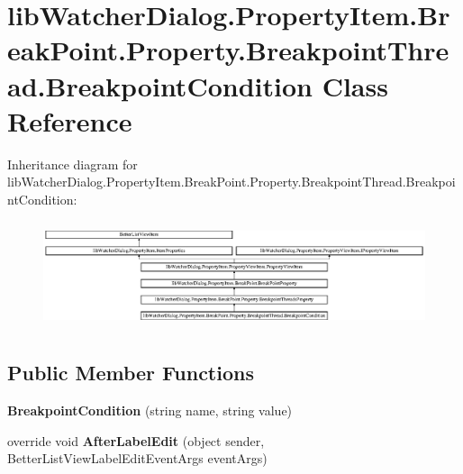 \hypertarget{classlib_watcher_dialog_1_1_property_item_1_1_break_point_1_1_property_1_1_breakpoint_thread_1_1_breakpoint_condition}{\section{lib\+Watcher\+Dialog.\+Property\+Item.\+Break\+Point.\+Property.\+Breakpoint\+Thread.\+Breakpoint\+Condition Class Reference}
\label{classlib_watcher_dialog_1_1_property_item_1_1_break_point_1_1_property_1_1_breakpoint_thread_1_1_breakpoint_condition}
}
Inheritance diagram for lib\+Watcher\+Dialog.\+Property\+Item.\+Break\+Point.\+Property.\+Breakpoint\+Thread.\+Breakpoint\+Condition\+:\begin{figure}[H]
\begin{center}
\leavevmode
\includegraphics[height=3.169811cm]{classlib_watcher_dialog_1_1_property_item_1_1_break_point_1_1_property_1_1_breakpoint_thread_1_1_breakpoint_condition}
\end{center}
\end{figure}
\subsection*{Public Member Functions}
\begin{DoxyCompactItemize}
\item 
\hypertarget{classlib_watcher_dialog_1_1_property_item_1_1_break_point_1_1_property_1_1_breakpoint_thread_1_1_breakpoint_condition_aed24c36827888d50295a9294df436627}{{\bfseries Breakpoint\+Condition} (string name, string value)}\label{classlib_watcher_dialog_1_1_property_item_1_1_break_point_1_1_property_1_1_breakpoint_thread_1_1_breakpoint_condition_aed24c36827888d50295a9294df436627}

\item 
\hypertarget{classlib_watcher_dialog_1_1_property_item_1_1_break_point_1_1_property_1_1_breakpoint_thread_1_1_breakpoint_condition_a907d770bfa84434757fcbc808fe73f6c}{override void {\bfseries After\+Label\+Edit} (object sender, Better\+List\+View\+Label\+Edit\+Event\+Args event\+Args)}\label{classlib_watcher_dialog_1_1_property_item_1_1_break_point_1_1_property_1_1_breakpoint_thread_1_1_breakpoint_condition_a907d770bfa84434757fcbc808fe73f6c}

\end{DoxyCompactItemize}
